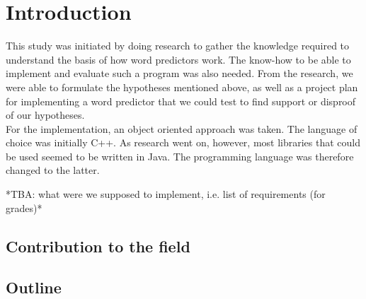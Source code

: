 \section{Introduction}
This study was initiated by doing research to gather the knowledge required to understand the basis of how word predictors work. The know-how to be able to implement and evaluate such a program was also needed. From the research, we were able to formulate the hypotheses mentioned above, as well as a project plan for implementing a word predictor that we could test to find support or disproof of our hypotheses.\\

For the implementation, an object oriented approach was taken. The language of choice was initially C++. As research went on, however, most libraries that could be used seemed to be written in Java. The programming language was therefore changed to the latter.

*TBA: what were we supposed to implement, i.e. list of requirements (for grades)*
\cite{keystrokes}
\cite{smoothing}
\cite{corpus}

\subsection{Contribution to the field}
\lipsum[1]
\subsection{Outline}
\lipsum[1]